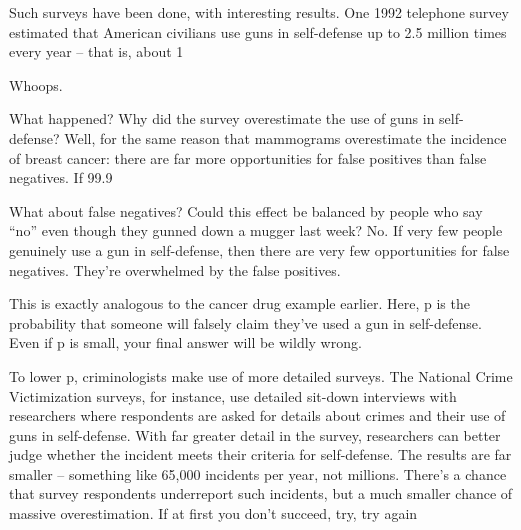Such surveys have been done, with interesting results. One 1992 telephone survey estimated that American civilians use guns in self-defense up to 2.5 million times every year – that is, about 1%

Whoops.

What happened? Why did the survey overestimate the use of guns in self-defense? Well, for the same reason that mammograms overestimate the incidence of breast cancer: there are far more opportunities for false positives than false negatives. If 99.9%

What about false negatives? Could this effect be balanced by people who say “no” even though they gunned down a mugger last week? No. If very few people genuinely use a gun in self-defense, then there are very few opportunities for false negatives. They’re overwhelmed by the false positives.

This is exactly analogous to the cancer drug example earlier. Here, p is the probability that someone will falsely claim they’ve used a gun in self-defense. Even if p is small, your final answer will be wildly wrong.

To lower p, criminologists make use of more detailed surveys. The National Crime Victimization surveys, for instance, use detailed sit-down interviews with researchers where respondents are asked for details about crimes and their use of guns in self-defense. With far greater detail in the survey, researchers can better judge whether the incident meets their criteria for self-defense. The results are far smaller – something like 65,000 incidents per year, not millions. There’s a chance that survey respondents underreport such incidents, but a much smaller chance of massive overestimation.
If at first you don’t succeed, try, try again


